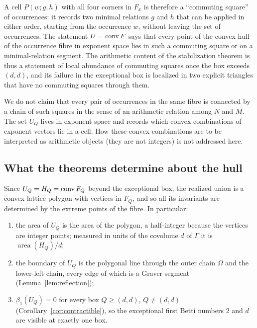 A cell $P(w;g,h)$ with all four corners in $F_x$ is therefore a ``commuting square'' of occurrences: it records two minimal relations $g$ and $h$ that can be applied in either order, starting from the occurrence $w$, without leaving the set of occurrences. The statement $U=\operatorname{conv} F$ says that every point of the convex hull of the occurrence fibre in exponent space lies in such a commuting square or on a minimal-relation segment. The arithmetic content of the stabilization theorem is thus a statement of local abundance of commuting squares once the box exceeds $(d,d)$, and its failure in the exceptional box is localized in two explicit triangles that have no commuting squares through them.

\begin{remark}
We do not claim that every pair of occurrences in the same fibre is connected by a chain of such squares in the sense of an arithmetic relation among $N$ and $M$. The set $U_Q$ lives in exponent space and records which convex combinations of exponent vectors lie in a cell. How these convex combinations are to be interpreted as arithmetic objects (they are not integers) is not addressed here.
\end{remark}

\subsection{What the theorems determine about the hull}

Since $U_Q=H_Q=\operatorname{conv} F_Q$ beyond the exceptional box, the realized union is a convex lattice polygon with vertices in $F_Q$, and so all its invariants are determined by the extreme points of the fibre. In particular:

\begin{enumerate}
\item the area of $U_Q$ is the area of the polygon, a half-integer because the vertices are integer points; measured in units of the covolume $d$ of $\Gamma$ it is $\operatorname{area}(H_Q)/d$;
\item the boundary of $U_Q$ is the polygonal line through the outer chain $\Omega$ and the lower-left chain, every edge of which is a Graver segment (Lemma~\ref{lem:reflection});
\item $\beta_1(U_Q)=0$ for every box $Q\ge(d,d)$, $Q\ne(d,d)$ (Corollary~\ref{cor:contractible}), so the exceptional first Betti numbers $2$ and $d$ are visible at exactly one box.
\end{enumerate}

